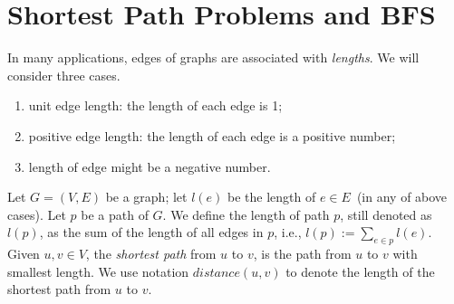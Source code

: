 \section{Shortest Path Problems and BFS}

In many applications, edges of graphs are associated with \emph{lengths}.
We will consider three cases.
\vspace*{-\topsep}
\begin{enumerate}
\item unit edge length: the length of each edge is 1;
\item positive edge length: the length of each edge is a positive number;
\item length of edge might be a negative number.
\end{enumerate}

Let $G = (V, E)$ be a graph; let $l(e)$ be the length of $e\in E$~(in any of above cases).
Let $p$ be a path of $G$. We define the length of path $p$, still denoted as $l(p)$,
as the sum of the length of all edges in $p$, i.e., $l(p) := \sum_{e\in p} l(e)$.
Given $u,v\in V$, the \emph{shortest path} from $u$ to $v$, is the path from $u$ to $v$
with smallest length. We use notation $distance(u,v)$ to denote the length
of the shortest path from $u$ to $v$.


